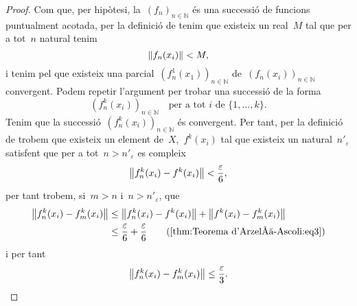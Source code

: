 \documentclass[../../main.tex]{subfiles}
\begin{document}
\begin{lemma}
\begin{proof}
            Com que, per hipòtesi, la~\((f_{n})_{n\in\mathbb{N}}\) és una successió de funcions puntualment acotada, per la definició de  tenim que existeix un real~\(M\) tal que per a tot~\(n\) natural tenim
            \[
                \norm{f_{n}(x_{i})}<M,
            \]
            i tenim pel  que existeix una parcial~\((f_{n}^{1}(x_{1}))_{n\in\mathbb{N}}\) de~\((f_{n}(x_{i}))_{n\in\mathbb{N}}\) convergent.
            Podem repetir l'argument per trobar una successió de la forma
            \[
                (f^{k}_{n}(x_{i}))_{n\in\mathbb{N}}\quad\text{per a tot }i\text{ de }\{1,\dots,k\}.
            \]
            Tenim que la successió~\((f^{k}_{n}(x_{i}))_{n\in\mathbb{N}}\) és convergent.
            Per tant, per la definició de  trobem que existeix un element de~\(X\),~\(f^{k}(x_{i})\) tal que existeix un natural~\(n'_{\varepsilon}\) satisfent que per a tot~\(n>n'_{\varepsilon}\) es compleix
            \begin{equation}
                \label{thm:Teorema d'Arzelà-Ascoli:eq3}
                \norm{f^{k}_{n}(x_{i})-f^{k}(x_{i})}<\frac{\varepsilon}{6},
            \end{equation}
            per tant trobem, si~\(m>n\) i~\(n>n'_{\varepsilon}\), que
            \begin{align*}
                \norm{f^{k}_{n}(x_{i})-f^{k}_{m}(x_{i})}&\leq\norm{f^{k}_{n}(x_{i})-f^{k}(x_{i})}+\norm{f^{k}(x_{i})-f^{k}_{m}(x_{i})} \\
                &\leq\frac{\varepsilon}{6}+\frac{\varepsilon}{6} \tag{\ref{thm:Teorema d'Arzelà-Ascoli:eq3}}
            \end{align*}
            i per tant
            \begin{equation}
                \label{thm:Teorema d'Arzelà-Ascoli:eq4}
                \norm{f^{k}_{n}(x_{i})-f^{k}_{m}(x_{i})}\leq\frac{\varepsilon}{3}.
            \end{equation}


\end{proof}
\end{lemma}
\end{document}
